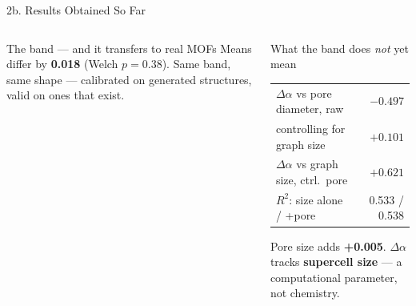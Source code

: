 \documentclass[aspectratio=169, 11pt]{beamer}
\begin{document}
\begin{frame}{2b. Results Obtained So Far}
\begin{columns}[T]
\begin{block}{\footnotesize The band --- and it transfers to real MOFs}
{Means differ by \textbf{0.018} (Welch $p=0.38$). Same band,
same shape --- calibrated on generated structures,
valid on ones that exist.}
\end{block}

\begin{alertblock}{\footnotesize What the band does \textit{not} yet mean}
{\scriptsize
\begin{tabular}{@{}lr@{}}
$\Delta\alpha$ vs pore diameter, raw & $-0.497$ \\
\quad controlling for graph size & \textbf{$+0.101$} \\
$\Delta\alpha$ vs graph size, ctrl.\ pore & \textbf{$+0.621$} \\
\midrule
$R^2$: size alone / +pore & 0.533 / 0.538 \\
\end{tabular}
\vspace{0.08cm}

Pore size adds \textbf{+0.005}.
$\Delta\alpha$ tracks \textbf{supercell size} --- a
computational parameter, not chemistry.}
\end{alertblock}
\end{columns}
\end{frame}

\end{document}
